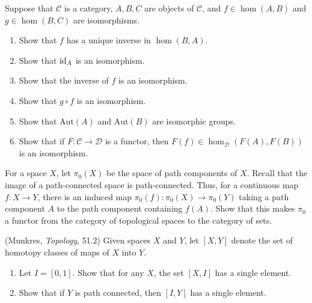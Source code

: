\documentclass[12pt]{article}
\begin{document}
\begin{solu}

\end{solu}
\newpage


\begin{problab}{4}
Suppose that $\mathcal{C}$ is a category, $A, B, C$ are objects of $\mathcal{C}$, and $f \in \hom(A,B)$ and $g \in \hom(B,C)$ are isomorphisms. 
    \begin{enumerate}
        \item Show that $f$ has a unique inverse in $\hom(B,A)$. 
        \item Show that $\operatorname{id}_A$ is an isomorphism.
        \item Show that the inverse of $f$ is an isomorphism.
        \item Show that $g \circ f$ is an isomorphism.
        \item Show that $\text{Aut}(A)$ and $\text{Aut}(B)$ are isomorphic groups.
        \item Show that if $F: \mathcal{C} \to \mathcal{D}$ is a functor, then $F(f) \in \hom_\mathcal{D} (F(A), F(B))$ is an isomorphism.
    \end{enumerate}
\end{problab}

\begin{solu}

\end{solu}
\newpage

\begin{problab}{5}
For a space $X$, let $\pi_0(X)$ be the space of path components of $X$. Recall that the image of a path-connected space is path-connected. Thus, for a continuous map $f: X \to Y$, there is an induced map $\pi_0(f): \pi_0(X) \to \pi_0(Y)$ taking a path component $A$ to the path component containing $f(A)$. Show that this makes $\pi_0$ a functor from the category of topological spaces to the category of sets.
\end{problab}


\begin{solu}
\newpage 
\end{solu}
\begin{problab}{6} (Munkres, \emph{Topology}, 51.2) Given spaces $X$ and $Y$, let $[X,Y]$ denote the set of homotopy classes of maps of $X$ into $Y$.
\begin{enumerate}
\item Let $I = [0,1]$. Show that for any $X$, the set $[X,I]$ has a single element.
\item Show that if $Y$ is path connected, then $[I,Y]$ has a single element.
\end{enumerate}
\end{problab}
\end{document}

